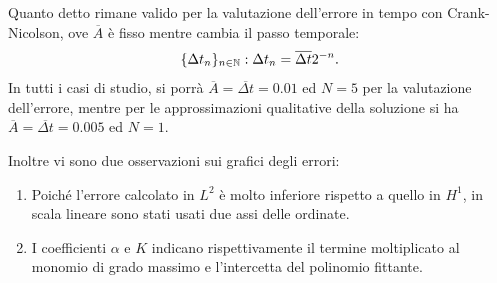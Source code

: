 \documentclass[11pt]{beamer}
\begin{document}
            \begin{frame}\frametitle{\insertsection{}}
                Quanto detto rimane valido per la valutazione dell'errore in tempo con Crank-Nicolson, ove $\overline A$ è fisso mentre cambia il passo temporale:
                \begin{equation*}
                    \setlength{\abovedisplayskip}{10pt plus 2pt minus 2pt}  %
                    \setlength{\belowdisplayskip}{10pt plus 2pt minus 2pt}  %
                    \{\Delta t_n\}_{n\in\mathbb N}:\Delta t_n=\overline{\Delta t}2^{-n}.
                \end{equation*}
                In tutti i casi di studio, si porrà $\overline A=\overline{\Delta t}=0.01$ ed $N=5$ per la valutazione dell'errore, mentre per le approssimazioni qualitative della soluzione si ha $\overline A=\overline{\Delta t}=0.005$ ed $N=1$.
        
                Inoltre vi sono due osservazioni sui grafici degli errori:
        
                \begin{enumerate}[label=\arabic*.,    %
                                  itemsep=2pt,        %
                                  leftmargin=12.5pt]    %
                
                    \item Poiché l'errore calcolato in $L^2$ è molto inferiore rispetto a quello in $H^1$, in scala lineare sono stati usati due assi delle ordinate.
                    
                    \item I coefficienti $\alpha$ e $K$ indicano rispettivamente il termine moltiplicato al monomio di grado massimo e l'intercetta del polinomio fittante.
        
                \end{enumerate}                
             \end{frame}

\end{document}

